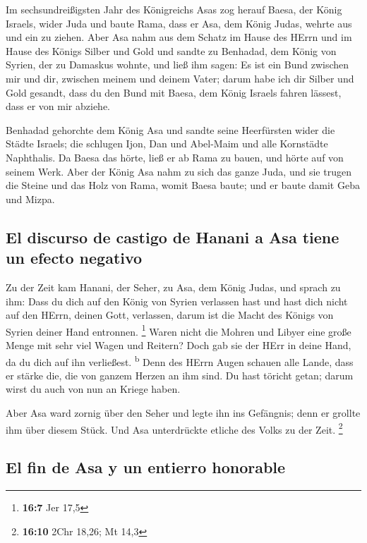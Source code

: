  Im sechsundreißigsten Jahr des Königreichs Asas zog
herauf Baesa, der König Israels, wider Juda und baute Rama, dass er Asa,
dem König Judas, wehrte aus und ein zu ziehen.  Aber Asa
nahm aus dem Schatz im Hause des HErrn und im Hause des Königs Silber
und Gold und sandte zu Benhadad, dem König von Syrien, der zu Damaskus
wohnte, und ließ ihm sagen:  Es ist ein Bund zwischen mir
und dir, zwischen meinem und deinem Vater; darum habe ich dir Silber und
Gold gesandt, dass du den Bund mit Baesa, dem König Israels fahren
lässest, dass er von mir abziehe.

 Benhadad gehorchte dem König Asa und sandte seine
Heerfürsten wider die Städte Israels; die schlugen Ijon, Dan und
Abel-Maim und alle Kornstädte Naphthalis.  Da Baesa das
hörte, ließ er ab Rama zu bauen, und hörte auf von seinem Werk.
 Aber der König Asa nahm zu sich das ganze Juda, und sie
trugen die Steine und das Holz von Rama, womit Baesa baute; und er baute
damit Geba und Mizpa.

\hypertarget{el-discurso-de-castigo-de-hanani-a-asa-tiene-un-efecto-negativo}{%
\subsection{El discurso de castigo de Hanani a Asa tiene un efecto
negativo}\label{el-discurso-de-castigo-de-hanani-a-asa-tiene-un-efecto-negativo}}

 Zu der Zeit kam Hanani, der Seher, zu Asa, dem König
Judas, und sprach zu ihm: Dass du dich auf den König von Syrien
verlassen hast und hast dich nicht auf den HErrn, deinen Gott,
verlassen, darum ist die Macht des Königs von Syrien deiner Hand
entronnen. \footnote{\textbf{16:7} Jer 17,5}  Waren nicht
die Mohren und Libyer eine große Menge mit sehr viel Wagen und Reitern?
Doch gab sie der HErr in deine Hand, da du dich auf ihn verließest.
\textsuperscript{b}  Denn des HErrn Augen schauen alle
Lande, dass er stärke die, die von ganzem Herzen an ihm sind. Du hast
töricht getan; darum wirst du auch von nun an Kriege haben.

 Aber Asa ward zornig über den Seher und legte ihn ins
Gefängnis; denn er grollte ihm über diesem Stück. Und Asa unterdrückte
etliche des Volks zu der Zeit. \footnote{\textbf{16:10} 2Chr 18,26; Mt
  14,3}

\hypertarget{el-fin-de-asa-y-un-entierro-honorable}{%
\subsection{El fin de Asa y un entierro
honorable}\label{el-fin-de-asa-y-un-entierro-honorable}}

